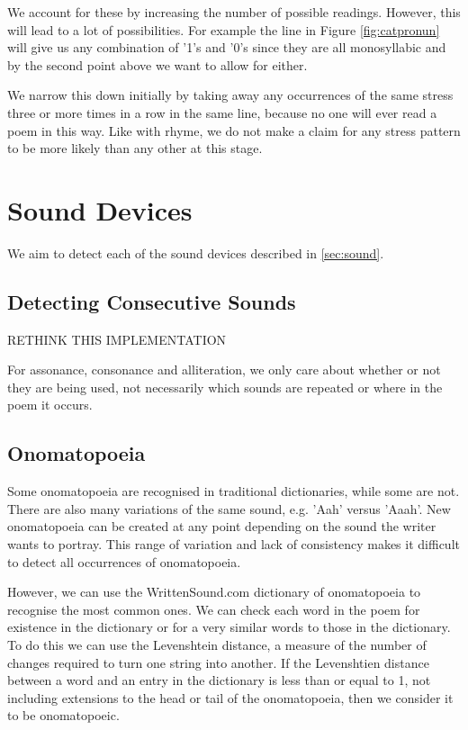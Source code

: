 We account for these by increasing the number of possible readings. However, this will lead to a lot of possibilities. For example the line in Figure \ref{fig:catpronun} will give us any combination of '1's and '0's since they are all monosyllabic and by the second point above we want to allow for either. 

We narrow this down initially by taking away any occurrences of the same stress three or more times in a row in the same line, because no one will ever read a poem in this way.  Like with rhyme, we do not make a claim for any stress pattern to be more likely than any other at this stage.


\section{Sound Devices}

We aim to detect each of the sound devices described in \ref{sec:sound}.

\subsection{Detecting Consecutive Sounds}

RETHINK THIS IMPLEMENTATION

For assonance, consonance and alliteration, we only care about whether or not they are being used, not necessarily which sounds are repeated or where in the poem it occurs.

\subsection{Onomatopoeia}

Some onomatopoeia are recognised in traditional dictionaries, while some are not. There are also many variations of the same sound, e.g. 'Aah' versus 'Aaah'. New onomatopoeia can be created at any point depending on the sound the writer wants to portray. This range of variation and lack of consistency makes it difficult to detect all occurrences of onomatopoeia.

However, we can use the WrittenSound.com dictionary of onomatopoeia to recognise the most common ones. We can check each word in the poem for existence in the dictionary or for a very similar words to those in the dictionary. To do this we can use the Levenshtein distance, a measure of the number of changes required to turn one string into another. If the Levenshtien distance between a word and an entry in the dictionary is less than or equal to 1, not including extensions to the head or tail of the onomatopoeia, then we consider it to be onomatopoeic.


